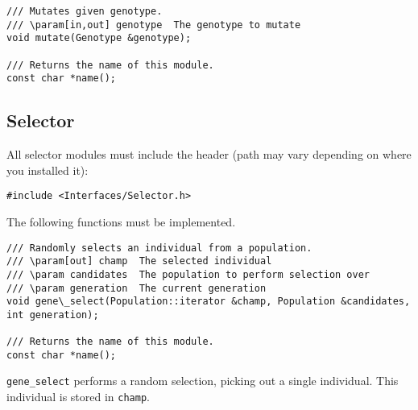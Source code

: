 \begin{verbatim}
/// Mutates given genotype.
/// \param[in,out] genotype  The genotype to mutate
void mutate(Genotype &genotype);

/// Returns the name of this module.
const char *name();
\end{verbatim}


\subsection{Selector}

All selector modules must include the header (path may vary depending on where you installed it):

\begin{verbatim}
#include <Interfaces/Selector.h>
\end{verbatim}

\noindent The following functions must be implemented.

\begin{verbatim}
/// Randomly selects an individual from a population.
/// \param[out] champ  The selected individual
/// \param candidates  The population to perform selection over
/// \param generation  The current generation
void gene\_select(Population::iterator &champ, Population &candidates, int generation);

/// Returns the name of this module.
const char *name();
\end{verbatim}

\noindent\texttt{gene\_select} performs a random selection, picking out a single individual. This individual is stored in \texttt{champ}.
